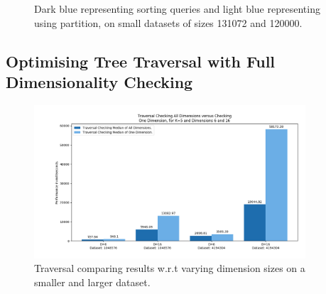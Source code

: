 
\begin{figure}[H]
  \centering
  \caption{Dark blue representing sorting queries and light blue representing using partition, on small datasets of sizes 131072 and 120000.}
\end{figure}






\subsection{Optimising Tree Traversal with Full Dimensionality Checking}

\begin{figure}[H]
\centering
\includegraphics[width=0.9\textwidth]{pics/plot-figs/trav-k5-no-1.png}
\caption{Traversal comparing results w.r.t varying dimension sizes on a smaller and larger dataset.}
\end{figure}


